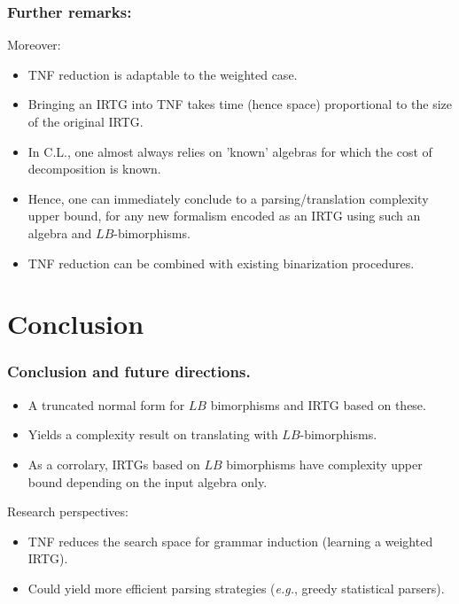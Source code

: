 \documentclass{beamer}
\begin{document}
\begin{frame}
  \frametitle{Further remarks:}
Moreover:
\begin{itemize}
\item TNF reduction is adaptable to the weighted case.
\item Bringing an IRTG into TNF takes time (hence space) proportional to the size of the original IRTG.
\item In C.L., one almost always relies on 'known' algebras for which the cost of decomposition is known.
\item Hence, one can immediately conclude to a parsing/translation complexity upper bound, for any new formalism encoded as an IRTG using such an algebra and $LB$-bimorphisms.
\item TNF reduction can be combined with existing binarization procedures. 
\end{itemize}
\end{frame}



\section{Conclusion}

\begin{frame}
  \frametitle{Conclusion and future directions.}
  \begin{itemize}
  \item A truncated normal form for $LB$ bimorphisms and IRTG based on these.
  \item Yields a complexity result on translating with $LB$-bimorphisms.
  \item As a corrolary, IRTGs based on $LB$ bimorphisms have complexity upper bound depending on the input algebra only.
  \end{itemize}

  Research perspectives:
  \begin{itemize}
  \item TNF reduces the search space for grammar induction (learning a weighted IRTG).
  \item Could yield more efficient parsing strategies (\emph{e.g.}, greedy statistical parsers).
  \end{itemize}
\end{frame}
 
\end{document}
